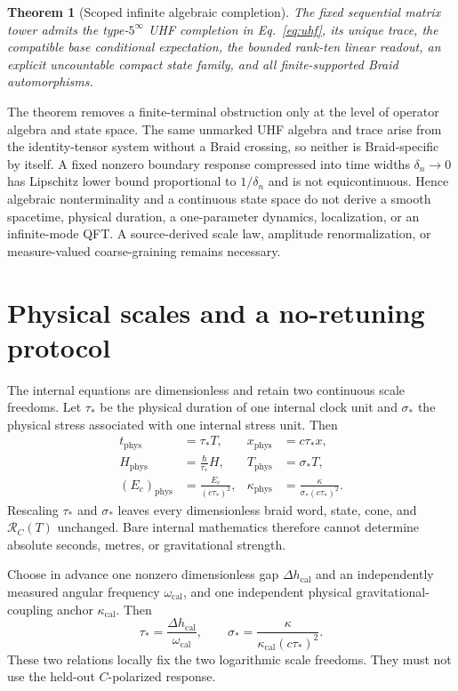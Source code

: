 \documentclass[11pt]{article}
\newtheorem{theorem}{Theorem}[section]
\theoremstyle{definition}
\theoremstyle{remark}
\newcommand{\RC}{\mathcal{R}_{C}}
\begin{document}
\begin{theorem}[Scoped infinite algebraic completion]\label{thm:uhf}
The fixed sequential matrix tower admits the type-$5^\infty$ UHF completion in Eq.~\eqref{eq:uhf}, its unique trace, the compatible base conditional expectation, the bounded rank-ten linear readout, an explicit uncountable compact state family, and all finite-supported Braid automorphisms.
\end{theorem}

The theorem removes a finite-terminal obstruction only at the level of operator algebra and state space. The same unmarked UHF algebra and trace arise from the identity-tensor system without a Braid crossing, so neither is Braid-specific by itself. A fixed nonzero boundary response compressed into time widths $\delta_n\to0$ has Lipschitz lower bound proportional to $1/\delta_n$ and is not equicontinuous. Hence algebraic nonterminality and a continuous state space do not derive a smooth spacetime, physical duration, a one-parameter dynamics, localization, or an infinite-mode QFT. A source-derived scale law, amplitude renormalization, or measure-valued coarse-graining remains necessary.

\section{Physical scales and a no-retuning protocol}

The internal equations are dimensionless and retain two continuous scale freedoms. Let $\tau_*$ be the physical duration of one internal clock unit and $\sigma_*$ the physical stress associated with one internal stress unit. Then
\begin{align}
 t_{\mathrm{phys}}&=\tau_*T,&
 x_{\mathrm{phys}}&=c\tau_*x,\\
 H_{\mathrm{phys}}&=\frac{\hbar}{\tau_*}H,&
 T_{\mathrm{phys}}&=\sigma_*T,\\
 (E_c)_{\mathrm{phys}}&=\frac{E_c}{(c\tau_*)^2},&
 \kappa_{\mathrm{phys}}&=\frac{\kappa}{\sigma_*(c\tau_*)^2}.
\end{align}
Rescaling $\tau_*$ and $\sigma_*$ leaves every dimensionless braid word, state, cone, and $\RC(T)$ unchanged. Bare internal mathematics therefore cannot determine absolute seconds, metres, or gravitational strength.

Choose in advance one nonzero dimensionless gap $\Delta h_{\mathrm{cal}}$ and an independently measured angular frequency $\omega_{\mathrm{cal}}$, and one independent physical gravitational-coupling anchor $\kappa_{\mathrm{cal}}$. Then
\begin{equation}
 \tau_*=\frac{\Delta h_{\mathrm{cal}}}{\omega_{\mathrm{cal}}},
 \qquad
 \sigma_*=\frac{\kappa}{\kappa_{\mathrm{cal}}(c\tau_*)^2}.
\end{equation}
These two relations locally fix the two logarithmic scale freedoms. They must not use the held-out $C$-polarized response.
\end{document}
